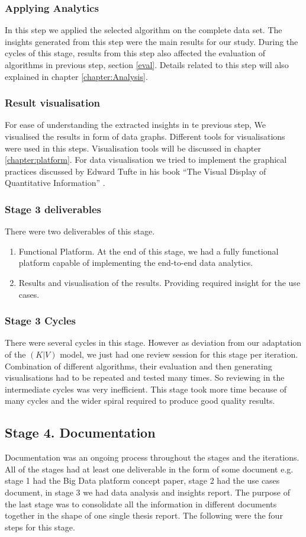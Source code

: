 \subsubsection{Applying Analytics}
In this step we applied the selected algorithm on the complete data set. The insights generated from this step were the main results for our study. During the cycles of this stage, results from this step also affected the evaluation of algorithms in previous step, section \ref{eval}. Details related to this step will also explained in chapter \ref{chapter:Analysis}.    
\subsubsection{Result visualisation}
For ease of understanding the extracted insights in te previous step, We visualised the results in form of data graphs. Different tools for visualisations were used in this steps. Visualisation tools will be discussed in chapter \ref{chapter:platform}. For data visualisation we tried to implement the graphical practices discussed by Edward Tufte in his book ``The Visual Display of Quantitative Information'' \cite{tufte1983visual}.
\subsubsection{Stage 3 deliverables}
There were two deliverables of this stage.
\begin{enumerate}
\item Functional Platform. At the end of this stage, we had a fully functional platform capable of implementing the end-to-end data analytics.
\item Results and visualisation of the results. Providing required insight for the use cases. 
\end{enumerate}
\subsubsection{Stage 3 Cycles}
There were several cycles in this stage. However as deviation from our adaptation of the \((K|V)\) model, we just had one review session for this stage per iteration. Combination of different algorithms, their evaluation and then generating visualisations had to be repeated and tested many times. So reviewing in the intermediate cycles was very inefficient. This stage took more time because of many cycles and the wider spiral required to produce good quality results.
\subsection{Stage 4. Documentation}
Documentation was an ongoing process throughout the stages and the iterations. All of the stages had at least one deliverable in the form of some document e.g. stage 1 had the Big Data platform concept paper, stage 2 had the use cases document, in stage 3 we had data analysis and insights report. The purpose of the last stage was to consolidate all the information in different documents together in the shape of one single thesis report. The following were the four steps for this stage. 
